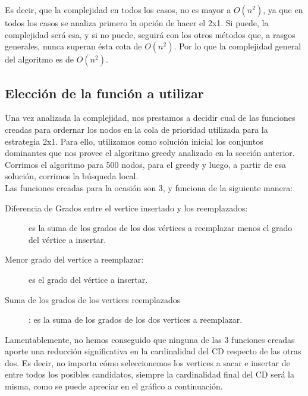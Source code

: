  Es decir, que la complejidad en todos los casos, no es mayor a $O(n^2)$, ya que en todos los casos se analiza primero la opción de hacer el 2x1. Si puede, la complejidad será esa, y si no puede, seguirá con los otros métodos que, a rasgos generales, nunca superan ésta cota de $O(n^2)$. Por lo que la complejidad general del algoritmo es de \textbf{$O(n^2)$}.
 
 \subsection{Elección de la función a utilizar}
 Una vez analizada la complejidad, nos prestamos a decidir cual de las funciones creadas para ordernar los nodos en la cola de prioridad utilizada para la estrategia 2x1. Para ello, utilizamos como solución inicial los conjuntos dominantes que nos provee el algoritmo greedy analizado en la sección anterior. Corrimos el algoritmo para 500 nodos, para el greedy y luego, a partir de esa solución, corrimos la búsqueda local. \\
Las funciones creadas para la ocasión son 3, y funciona de la siguiente manera: 
\begin{description}
\item[Diferencia de Grados entre el vertice insertado y los reemplazados:] es la suma de los grados de los dos vértices a reemplazar menos el grado del vértice a insertar.
\item[Menor grado del vertice a reemplazar:] es el grado del vértice a insertar.
\item[Suma de los grados de los vertices reemplazados]: es la suma de los grados de los dos vertices a reemplazar.
\end{description}

Lamentablemente, no hemos conseguido que ninguna de las 3 funciones creadas aporte una reducción significativa en la cardinalidad del CD respecto de las otras dos. Es decir, no importa cómo seleccionemos los vertices a sacar e insertar de entre todos los posibles candidatos, siempre la cardinalidad final del CD será la misma, como se puede apreciar en el gráfico a continuación. \\

